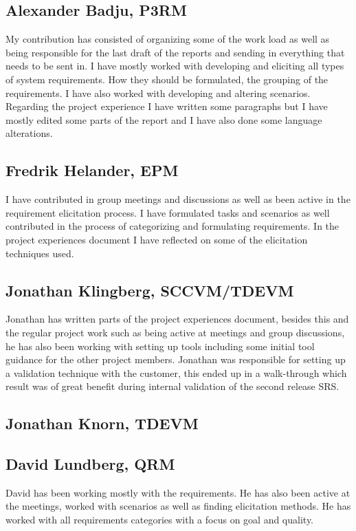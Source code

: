 \documentclass[10pt]{article}
\begin{document}
\subsection{Alexander Badju, P3RM}
My contribution has consisted of organizing some of the work load as well as being responsible for the last draft of the reports and sending in everything that needs to be sent in. I have mostly worked with developing and eliciting all types of system requirements. How they should be formulated, the grouping of the requirements. I have also worked with developing and altering scenarios. Regarding the project experience I have written some paragraphs but I have mostly edited some parts of the report and I have also done some language alterations.
\subsection{Fredrik Helander, EPM}
I have contributed in group meetings and discussions as well as been active in the requirement elicitation process. I have formulated tasks and scenarios as well contributed in the process of categorizing and formulating requirements. In the project experiences document I have reflected on some of the elicitation techniques used.
\subsection{Jonathan Klingberg, SCCVM/TDEVM}
Jonathan has written parts of the project experiences document, besides this and the regular project work such as being active at meetings and group discussions, he has also been working with setting up tools including some initial tool guidance for the other project members.
Jonathan was responsible for setting up a validation technique with the customer, this ended up in a walk-through which result was of great benefit during internal validation of the second release SRS.
\subsection{Jonathan Knorn, TDEVM}

\subsection{David Lundberg, QRM}
David has been working mostly with the requirements. He has also been active at the meetings, worked with scenarios as well as finding elicitation methods. He has worked with all requirements categories with a focus on goal and quality. 
\end{document}
